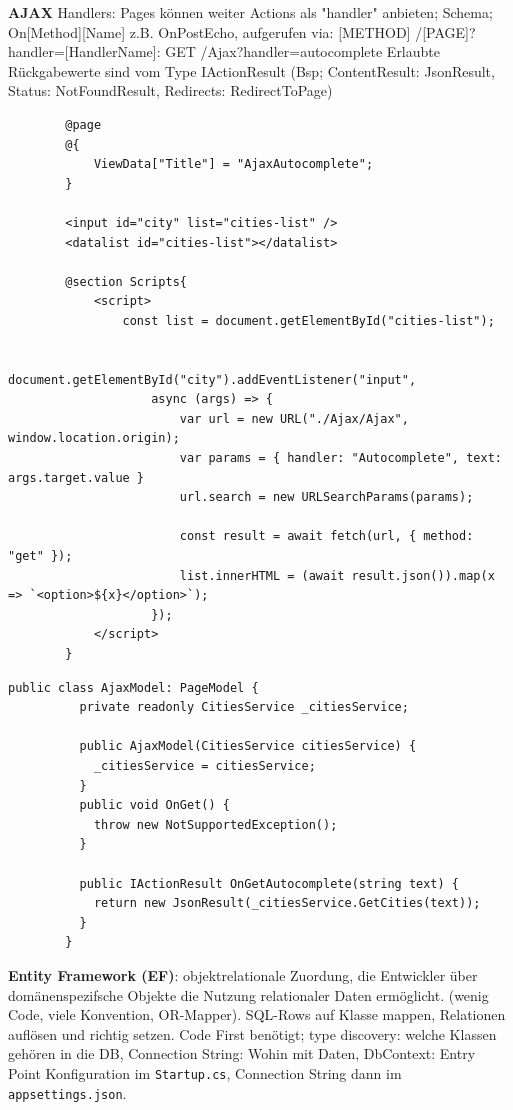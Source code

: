 \documentclass[10pt,landscape]{article}
\begin{document}
\begin{multicols}{2}
        \textbf{AJAX}
        Handlers: Pages können weiter Actions als "handler" anbieten; Schema; On[Method][Name] z.B. OnPostEcho, aufgerufen via: [METHOD] /[PAGE]?handler=[HandlerName]: GET /Ajax?handler=autocomplete
        Erlaubte Rückgabewerte sind vom Type IActionResult (Bsp; ContentResult: JsonResult, Status: NotFoundResult, Redirects: RedirectToPage)

        \begin{lstlisting}
        @page
        @{
            ViewData["Title"] = "AjaxAutocomplete";
        }

        <input id="city" list="cities-list" />
        <datalist id="cities-list"></datalist>

        @section Scripts{
            <script>
                const list = document.getElementById("cities-list");

                document.getElementById("city").addEventListener("input",
                    async (args) => {
                        var url = new URL("./Ajax/Ajax", window.location.origin);
                        var params = { handler: "Autocomplete", text: args.target.value }
                        url.search = new URLSearchParams(params);

                        const result = await fetch(url, { method: "get" });
                        list.innerHTML = (await result.json()).map(x => `<option>${x}</option>`);
                    });
            </script>
        }
        \end{lstlisting}\begin{lstlisting}[style=CSharp]
        public class AjaxModel: PageModel {
          private readonly CitiesService _citiesService;

          public AjaxModel(CitiesService citiesService) {
            _citiesService = citiesService;
          }
          public void OnGet() {
            throw new NotSupportedException();
          }

          public IActionResult OnGetAutocomplete(string text) {
            return new JsonResult(_citiesService.GetCities(text));
          }
        }
        \end{lstlisting}

        \textbf{Entity Framework (EF)}: objektrelationale Zuordung, die Entwickler über domänenspezifsche Objekte die Nutzung relationaler Daten ermöglicht. (wenig Code, viele Konvention, OR-Mapper). SQL-Rows auf Klasse mappen, Relationen auflösen und richtig setzen.
        Code First benötigt; type discovery: welche Klassen gehören in die DB, Connection String: Wohin mit Daten, DbContext: Entry Point
        Konfiguration im \lstinline{Startup.cs}, Connection String dann im \lstinline{appsettings.json}.


\end{multicols}
\end{document}

